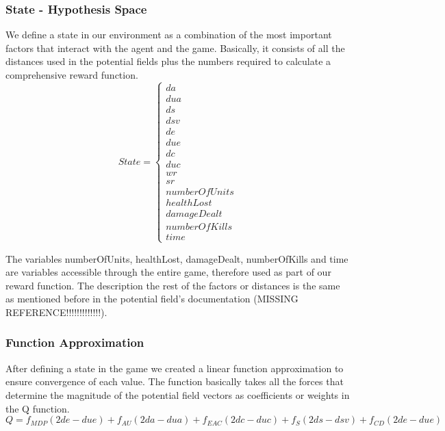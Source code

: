 \subsubsection{State - Hypothesis Space}

We define a state in our environment as a combination of the most important factors that interact with the agent and the game. Basically, it consists of all the distances used in the potential fields plus the numbers required to calculate a comprehensive reward function. \\
\begin{displaymath}
                       State = \begin{cases}
                         da \\  dua \\  ds \\  dsv \\ de \\ due \\ dc \\ duc \\ wr \\ sr \\ numberOfUnits \\ healthLost \\ damageDealt \\ numberOfKills \\ time
                      \end{cases}
\end{displaymath}

The variables numberOfUnits, healthLost, damageDealt, numberOfKills and time are variables accessible through the entire game, therefore used as part of our reward function. The description the rest of the factors or distances is the same as mentioned before in the potential field's documentation (MISSING REFERENCE!!!!!!!!!!!!!). 

\subsubsection{Function Approximation}

After defining a state in the game we created a linear function approximation to ensure convergence of each value. The function basically takes all the forces that determine the magnitude of the potential field vectors as coefficients or weights in the Q function. \\ 

$Q = f_{MDP} (2de - due) + f_{AU} (2da - dua) + f_{EAC} (2dc - duc) + f_{S}  (2ds - dsv) + f_{CD} (2de - due)$ \\ 

